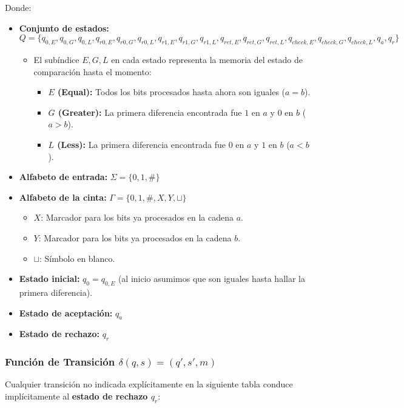 Donde:
\begin{itemize}[leftmargin=*]
    \item \textbf{Conjunto de estados:}
    \[ Q = \{ q_{0,E}, q_{0,G}, q_{0,L}, q_{r0,E}, q_{r0,G}, q_{r0,L}, q_{r1,E}, q_{r1,G}, q_{r1,L}, q_{ret,E}, q_{ret,G}, q_{ret,L}, q_{check,E}, q_{check,G}, q_{check,L}, q_a, q_r \} \]
    \begin{itemize}[leftmargin=*]
        \item El subíndice $E, G, L$ en cada estado representa la memoria del estado de comparación hasta el momento:
        \begin{itemize}[leftmargin=*]
            \item \textbf{$E$ (Equal):} Todos los bits procesados hasta ahora son iguales ($a = b$).
            \item \textbf{$G$ (Greater):} La primera diferencia encontrada fue $1$ en $a$ y $0$ en $b$ ($a > b$).
            \item \textbf{$L$ (Less):} La primera diferencia encontrada fue $0$ en $a$ y $1$ en $b$ ($a < b$).
        \end{itemize}
    \end{itemize}
    \item \textbf{Alfabeto de entrada:} $\Sigma = \{0, 1, \#\}$
    \item \textbf{Alfabeto de la cinta:} $\Gamma = \{0, 1, \#, X, Y, \sqcup\}$
    \begin{itemize}[leftmargin=*]
        \item $X$: Marcador para los bits ya procesados en la cadena $a$.
        \item $Y$: Marcador para los bits ya procesados en la cadena $b$.
        \item $\sqcup$: Símbolo en blanco.
    \end{itemize}
    \item \textbf{Estado inicial:} $q_0 = q_{0,E}$ (al inicio asumimos que son iguales hasta hallar la primera diferencia).
    \item \textbf{Estado de aceptación:} $q_a$
    \item \textbf{Estado de rechazo:} $q_r$
\end{itemize}

\subsubsection*{Función de Transición $\delta(q, s) = (q', s', m)$}

Cualquier transición no indicada explícitamente en la siguiente tabla conduce implícitamente al \textbf{estado de rechazo $q_r$}:

